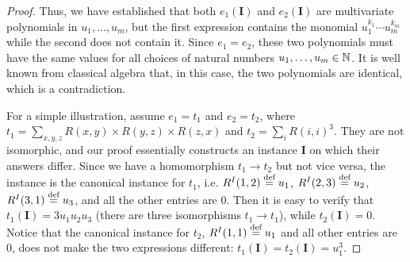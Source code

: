 \begin{proof}
Thus, we have established that both $e_1(\pmb{I})$ and  $e_2(\pmb{I})$
are multivariate polynomials in $u_1, \ldots, u_m$, but the first
expression contains the monomial  $u_1^{k_1} \cdots u_m^{k_m}$ while
the second does not contain it.  Since $e_1 = e_2$, these two
polynomials must have the same values for all choices of natural
numbers $u_1, \ldots, u_m \in \mathbb N$.  It is well known from classical
algebra that, in this case, the two polynomials are identical,
which is a contradiction. 

For a simple illustration, assume $e_1 = t_1$ and $e_2 = t_2$, where
$t_1 = \sum_{x,y,z} R(x,y) \times R(y,z) \times R(z,x)$ and
$t_2 = \sum_{i} R(i,i)^3$.  They are not isomorphic, and our proof
essentially constructs an instance $\pmb{I}$ on which their answers
differ.  Since we have a homomorphism $t_1 \rightarrow t_2$ but not
vice versa, the instance is the canonical instance for $t_1$, i.e.
$R^I(1,2) \stackrel{\text{def}}{=} u_1$, $R^I(2,3) \stackrel{\text{def}}{=} u_2$, $R^I(3,1) \stackrel{\text{def}}{=} u_3$,
and all the other entries are 0.  Then it is easy to verify that
$t_1(\pmb{I})= 3 u_1u_2u_3$ (there are three isomorphisms
$t_1 \rightarrow t_1$), while $t_2(\pmb{I}) = 0$.  Notice that the
canonical instance for $t_2$, $R^I(1,1) \stackrel{\text{def}}{=} u_1$ and all other
entries are 0, does not make the two expressions different:
$t_1(\pmb{I}) = t_2(\pmb{I}) = u_1^3$.
% 
% 
% 
% 
% 
% 
% 
% 
% 

\end{proof}
